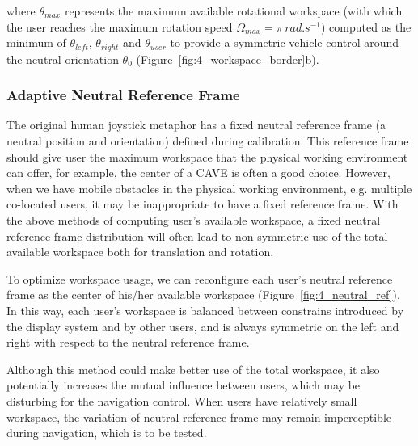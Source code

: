 where $\theta_{max}$ represents the maximum available rotational workspace (with which the user reaches the maximum rotation speed $\Omega_{max}=\pi\, rad.s^{-1}$) computed as the minimum of $\theta_{left}$, $\theta_{right}$ and $\theta_{user}$ to provide a symmetric vehicle control around the neutral orientation $\theta_{0}$ (Figure~\ref{fig:4_workspace_border}b).  


\subsubsection{Adaptive Neutral Reference Frame}

The original human joystick metaphor has a fixed neutral reference frame (a neutral position and orientation) defined during calibration. This reference frame should give user the maximum workspace that the physical working environment can offer, for example, the center of a CAVE is often a good choice. However, when we have mobile obstacles in the physical working environment, e.g. multiple co-located users, it may be inappropriate to have a fixed reference frame. With the above methods of computing user's available workspace, a fixed neutral reference frame distribution will often lead to non-symmetric use of the total available workspace both for translation and rotation.

To optimize workspace usage, we can reconfigure each user's neutral reference frame as the center of his/her available workspace (Figure~\ref{fig:4_neutral_ref}). In this way, each user's workspace is balanced between constrains introduced by the display system and by other users, and is always symmetric on the left and right with respect to the neutral reference frame.

Although this method could make better use of the total workspace, it also potentially increases the mutual influence between users, which may be disturbing for the navigation control. When users have relatively small workspace, the variation of neutral reference frame may remain imperceptible during navigation, which is to be tested.   

